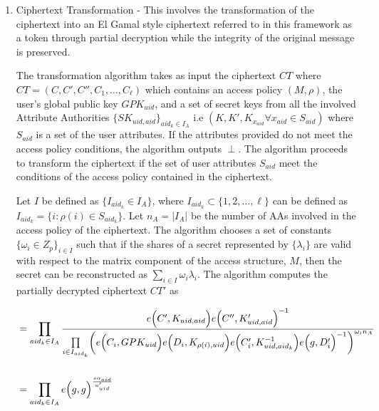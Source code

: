 \begin{enumerate}
	\item Ciphertext Transformation - This involves the transformation of the ciphertext into an El Gamal style ciphertext referred to in this framework as a token through partial decryption while the integrity of the original message is preserved.
	
	The transformation algorithm takes as input the ciphertext $CT$ where $CT = (C, C', C'', C_1,\ldots,C_\ell)$ which contains an access policy $(M,\rho)$, the user's global public key $GPK_{uid}$, and a set of secret keys from all the involved Attribute Authorities $\{SK_{uid,aid}\}_{aid_k \in I_{A}}$ i.e $(K, K', K_{x_{aid}} \forall x_{aid} \in S_{aid})$ where $S_{aid}$ is a set of the user attributes. If the attributes provided do not meet the access policy conditions, the algorithm outputs $\perp$. The algorithm proceeds to transform the ciphertext if the set of user attributes $S_{aid}$ meet the conditions of the access policy contained in the ciphertext.
	
	Let $I$ be defined as $\{I_{aid_k} \in I_{A}\}$, where $I_{aid_k} \subset \{1,2,\ldots,\ell\}$ can be defined as $I_{aid_k} = \{i: \rho(i) \in S_{aid_k}\}$. Let $n_A = |I_A|$ be the number of AAs  involved in the access policy of the ciphertext. The algorithm chooses a set of constants $\{\omega_{i} \in Z_p\}_{i \in I}$ such that if the shares of a secret represented by $\{\lambda_{i}\}$ are valid with respect to the matrix component of the access structure, $M$, then the secret can be reconstructed as $\sum_{i \in I}\omega_{i}\lambda_{i}$. The algorithm computes the partially decrypted ciphertext $CT'$ as
	
	\begin{align*}
	&= \prod\limits_{aid_{k} \in I_{A}} \frac{e\Bigl(C', K_{uid,aid}\Bigl)e\Bigl(C'', K'_{uid,aid}\Bigl)^{-1}}{\prod\limits_{i \in I_{aid_k}}\biggl(e\Bigl(C_i, GPK_{uid}\Bigl)e\Bigl(D_i, K_{\rho(i),uid}\Bigl)e\Bigl(C'_i, K_{uid,aid_k}^{-1}\Bigl)e\Bigl(g, D'_i\Bigl)^{-1}\biggl)^{\omega_{i}n_A}} \\ \\
	&= \prod\limits_{aid_{k} \in I_{A}} e\Bigl(g, g\Bigl)^{\frac{s\alpha_{aid}}{u'_{uid}}}
	\end{align*}
	
	
	
	

\end{enumerate}
